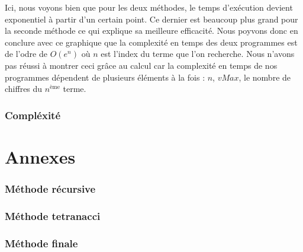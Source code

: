 \documentclass{article}
\newcommand{\code}[1]{}
\begin{document}
Ici, nous voyons bien que pour les deux méthodes, le temps d'exécution devient exponentiel à partir d'un certain point. Ce dernier est beaucoup plus grand pour la seconde méthode ce qui explique sa meilleure efficacité. Nous poyvons donc en conclure avec ce graphique que la complexité en temps des deux programmes est de l'odre de $O(e^{n})$ où $n$ est l'index du terme que l'on recherche. Nous n'avons pas réussi à montrer ceci grâce au calcul car la complexité en temps de nos programmes dépendent de plusieurs éléments à la fois : $n$, $vMax$, le nombre de chiffres du $n^{\text{ème}}$ terme.

\section{Compléxité}
\newpage
\part{Annexes}
\section*{Méthode récursive}
\code{Algos/Problem117_1_rapport.py}


\section*{Méthode tetranacci}
\code{Algos/Problem117_2_rapport.py}

\newpage
\section*{Méthode finale}
\code{Algos/Problem117_3_rapport.py}
\end{document}
